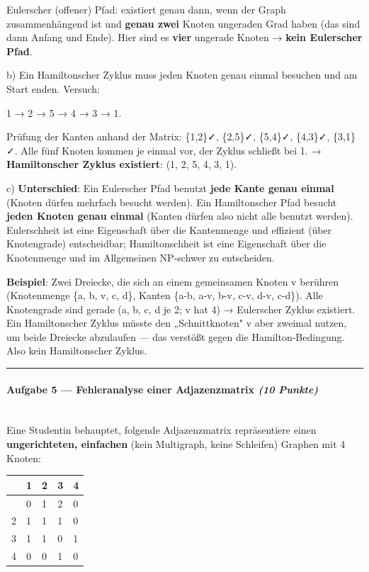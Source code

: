 \documentclass[11pt, a4paper]{article}
\begin{document}
Eulerscher (offener) Pfad: existiert genau dann, wenn der Graph zusammenhängend ist und \textbf{genau zwei} Knoten ungeraden Grad haben (das sind dann Anfang und Ende). Hier sind es \textbf{vier} ungerade Knoten → \textbf{kein Eulerscher Pfad}.


b) Ein Hamiltonscher Zyklus muss jeden Knoten genau einmal besuchen und am Start enden. Versuch:


1 → 2 → 5 → 4 → 3 → 1.


Prüfung der Kanten anhand der Matrix: \{1,2\}✓, \{2,5\}✓, \{5,4\}✓, \{4,3\}✓, \{3,1\}✓. Alle fünf Knoten kommen je einmal vor, der Zyklus schließt bei 1. → \textbf{Hamiltonscher Zyklus existiert}: (1, 2, 5, 4, 3, 1).


c) \textbf{Unterschied}: Ein Eulerscher Pfad benutzt \textbf{jede Kante genau einmal} (Knoten dürfen mehrfach besucht werden). Ein Hamiltonscher Pfad besucht \textbf{jeden Knoten genau einmal} (Kanten dürfen also nicht alle benutzt werden). Eulerschheit ist eine Eigenschaft über die Kantenmenge und effizient (über Knotengrade) entscheidbar; Hamiltonschheit ist eine Eigenschaft über die Knotenmenge und im Allgemeinen NP-schwer zu entscheiden.


\textbf{Beispiel}: Zwei Dreiecke, die sich an einem gemeinsamen Knoten v berühren (Knotenmenge \{a, b, v, c, d\}, Kanten \{a-b, a-v, b-v, c-v, d-v, c-d\}). Alle Knotengrade sind gerade (a, b, c, d je 2; v hat 4) → Eulerscher Zyklus existiert. Ein Hamiltonscher Zyklus müsste den „Schnittknoten" v aber zweimal nutzen, um beide Dreiecke abzulaufen — das verstößt gegen die Hamilton-Bedingung. Also kein Hamiltonscher Zyklus.



\noindent\textcolor{rulegray}{\rule{\linewidth}{0.4pt}}


\paragraph{Aufgabe 5 — Fehleranalyse einer Adjazenzmatrix \textit{(10 Punkte)}}\mbox{}\\[2pt]

Eine Studentin behauptet, folgende Adjazenzmatrix repräsentiere einen \textbf{ungerichteten, einfachen} (kein Multigraph, keine Schleifen) Graphen mit 4 Knoten:



{\small
\begin{tabularx}{\linewidth}{XXXXX}
\hline
\rowcolor{tableheadbg}
{\color{white}\textbf{}} & {\color{white}\textbf{1}} & {\color{white}\textbf{2}} & {\color{white}\textbf{3}} & {\color{white}\textbf{4}} \\[2pt]
\hline
\endhead
\hline
\endfoot
1 & 0 & 1 & 2 & 0 \\
2 & 1 & 1 & 1 & 0 \\
3 & 1 & 1 & 0 & 1 \\
4 & 0 & 0 & 1 & 0 \\
\end{tabularx}
}
\end{document}
